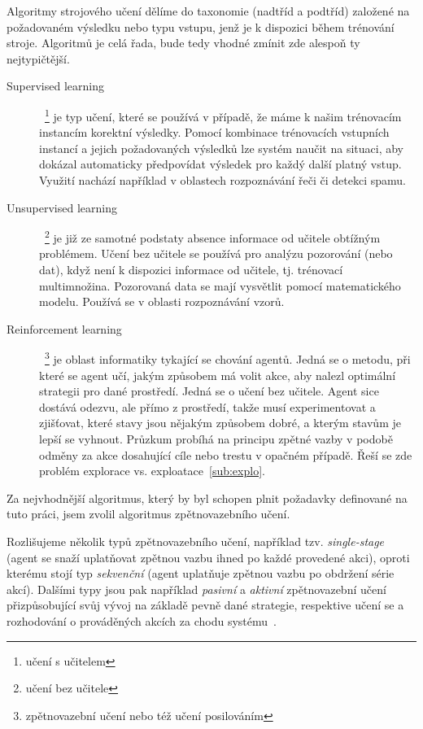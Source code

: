 \documentclass[thesis=M,czech]{FITthesis}[2014/05/07]
\begin{document}
Algoritmy strojového učení dělíme do taxonomie (nadtříd a podtříd) založené na požadovaném výsledku nebo typu vstupu, jenž je k dispozici během trénování stroje. Algoritmů je celá řada, bude tedy vhodné zmínit zde alespoň ty nejtypičtější. 

\begin{description}
  \item[Supervised learning]~\footnote{učení s učitelem} je typ učení, které se používá v případě, že máme k našim trénovacím instancím korektní výsledky. Pomocí kombinace trénovacích vstupních instancí a jejich požadovaných výsledků lze systém naučit na situaci, aby dokázal automaticky předpovídat výsledek pro každý další platný vstup. Využití nachází například v oblastech rozpoznávání řeči či detekci spamu.~\cite{aihorizon}
  \item[Unsupervised learning]~\footnote{učení bez učitele} je již ze samotné podstaty absence informace od učitele obtížným problémem. Učení bez učitele se používá pro analýzu pozorování (nebo dat), když není k dispozici informace od učitele, tj. trénovací multimnožina. Pozorovaná data se mají vysvětlit pomocí matematického modelu. Používá se v oblasti rozpoznávání vzorů.~\cite{hlavac}
  \item[Reinforcement learning]~\footnote{zpětnovazební učení nebo též učení posilováním} je oblast informatiky tykající se chování agentů. Jedná se o metodu, při které se agent učí, jakým způsobem má volit akce, aby nalezl optimální strategii pro dané prostředí. Jedná se o učení bez učitele. Agent sice dostává odezvu, ale přímo z prostředí, takže musí experimentovat a zjišťovat, které stavy jsou nějakým způsobem dobré, a kterým stavům je lepší se vyhnout. Průzkum probíhá na principu zpětné vazby v podobě odměny za akce dosahující cíle nebo trestu v opačném případě. Řeší se zde problém explorace vs. exploatace~\ref{sub:explo}. 
\end{description}

Za nejvhodnější algoritmus, který by byl schopen plnit požadavky definované na tuto práci, jsem zvolil algoritmus zpětnovazebního učení.

Rozlišujeme několik typů zpětnovazebního učení, například tzv. \emph{single-stage} (agent se snaží uplatňovat zpětnou vazbu ihned po každé provedené akci), oproti kterému stojí typ \emph{sekvenční} (agent uplatňuje zpětnou vazbu po obdržení série akcí). Dalšími typy jsou pak například \emph{pasivní} a \emph{aktivní} zpětnovazební učení přizpůsobující svůj vývoj na základě pevně dané strategie, respektive učení se a rozhodování o prováděných akcích za chodu systému~\cite{reinforcement}.
\end{document}
